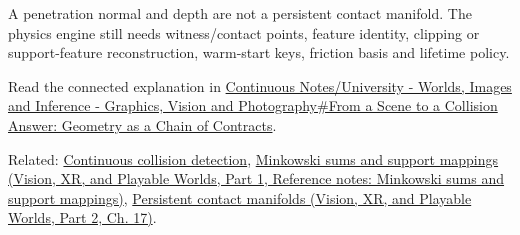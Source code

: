 \hypertarget{appendix-aef6177f7b3f-contact-generation-is-later}{}

A penetration normal and depth are not a persistent contact manifold. The physics engine still needs witness/contact points, feature identity, clipping or support-feature reconstruction, warm-start keys, friction basis and lifetime policy.

Read the connected explanation in \hyperref[03-visual-computing-i-ch020-from-a-scene-to-a-collision-answer-geometry-as-a-chain-of-contracts]{Continuous Notes/University - Worlds, Images and Inference - Graphics, Vision and Photography\#From a Scene to a Collision Answer: Geometry as a Chain of Contracts}.

Related: \hyperref[appendix-66956ed6c753]{Continuous collision detection}, \href{../07-Vision-XR-and-Playable-Worlds-P01/main.pdf\#nameddest=appendix-215ac7099a82}{Minkowski sums and support mappings (Vision, XR, and Playable Worlds, Part 1, Reference notes: Minkowski sums and support mappings)}, \href{../07-Vision-XR-and-Playable-Worlds-P02/main.pdf\#nameddest=06-engine-ii-ch046-complete-persistent-contact-implementation-and-cache-policy}{Persistent contact manifolds (Vision, XR, and Playable Worlds, Part 2, Ch. 17)}.
